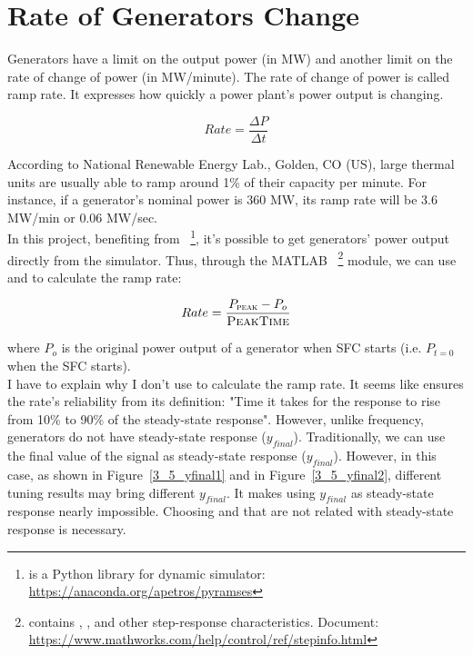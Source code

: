 \section{Rate of Generators Change} %
\label{section3.5}
Generators have a limit on the output power (in MW) and another limit on the rate of change of power (in MW/minute). The rate of change of power is called ramp rate. It expresses how quickly a power plant's power output is changing. 

\begin{equation}
    Rate = \frac{\Delta P}{\Delta t}
\end{equation}


According to National Renewable Energy Lab., Golden, CO (US), \cite{osti_15016292} large thermal units are usually able to ramp around 1\% of their capacity per minute. For instance, if a generator's nominal power is 360 MW, its ramp rate will be 3.6 MW/min or 0.06 MW/sec.\\

In this project, benefiting from ~\footnote{ is a Python library for  dynamic simulator: \href{https://anaconda.org/apetros/pyramses}{https://anaconda.org/apetros/pyramses}}, it's possible to get generators' power output directly from the simulator. Thus, through the MATLAB ~\footnote{ contains , , and other step-response characteristics. Document: \href{https://www.mathworks.com/help/control/ref/stepinfo.html}{https://www.mathworks.com/help/control/ref/stepinfo.html}} module, we can use  and  to calculate the ramp rate:

\begin{equation}
    Rate = \frac{P_{\textsc{peak}} - P_o}{\textsc{PeakTime}}
\end{equation}

where $P_o$ is the original power output of a generator when SFC starts (i.e. $P_{t=0}$ when the SFC starts).\\

I have to explain why I don't use  to calculate the ramp rate. It seems like  ensures the rate's reliability from its definition: "Time it takes for the response to rise from 10\% to 90\% of the steady-state response". However, unlike frequency, generators do not have steady-state response ($y_{final}$). Traditionally, we can use the final value of the signal as steady-state response ($y_{final}$). However, in this case, as shown in Figure~\ref{3_5_yfinal1} and in Figure~\ref{3_5_yfinal2}, different tuning results may bring different $y_{final}$. It makes using $y_{final}$ as steady-state response nearly impossible. Choosing  and  that are not related with steady-state response is necessary.

